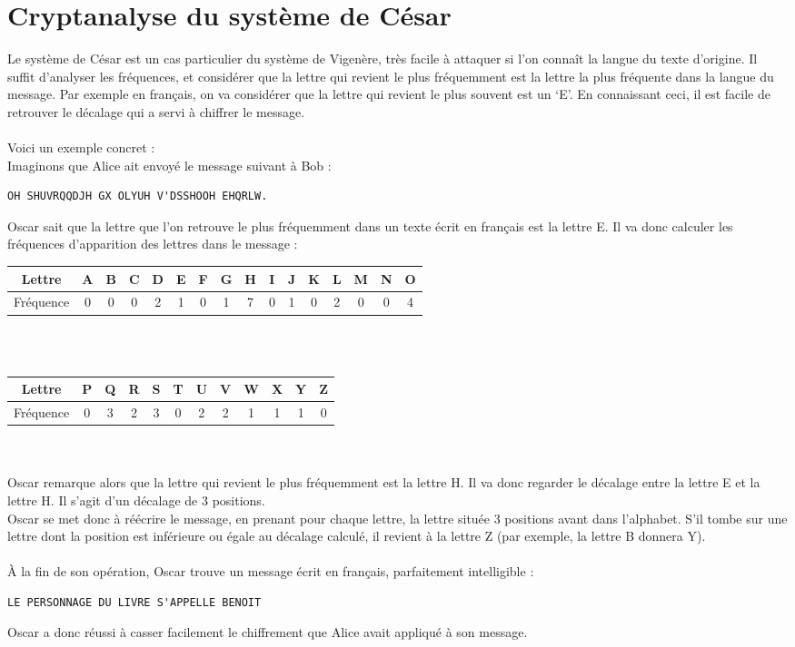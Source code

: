	\section{Cryptanalyse du système de César}
		Le système de César est un cas particulier du système de Vigenère, très facile à attaquer si l’on connaît la langue du texte d’origine. Il suffit d’analyser les fréquences, et considérer que la lettre qui revient le plus fréquemment est la lettre la plus fréquente dans la langue du message. Par exemple en français, on va considérer que la lettre qui revient le plus souvent est un ‘E’. En connaissant ceci, il est facile de retrouver le décalage qui a servi à chiffrer le message.\\
		\\
		Voici un exemple concret :\\
		Imaginons que Alice ait envoyé le message suivant à Bob :
		\begin{lstlisting}
OH SHUVRQQDJH GX OLYUH V'DSSHOOH EHQRLW.
		\end{lstlisting}
		Oscar sait que la lettre que l'on retrouve le plus fréquemment dans un texte écrit en français est la lettre E.
		Il va donc calculer les fréquences d'apparition des lettres dans le message :\\
		\begin{tabular}{ | c | c | c | c | c | c | c | c | c | c | c | c | c | c | c | c | }
			\hline
			Lettre & A & B & C & D & E & F & G & H & I & J & K & L & M & N & O\\ \hline
			Fréquence & 0 & 0 & 0 & 2 & 1 & 0 & 1 & 7 & 0 & 1  & 0 & 2 & 0 & 0 & 4\\
			\hline
		\end{tabular}\\
		\\
		\begin{tabular}{ | c | c | c | c | c | c | c | c | c | c | c | c | }
			\hline
			Lettre & P & Q & R & S & T & U & V & W & X & Y & Z\\ \hline
			Fréquence & 0 & 3 & 2 & 3 & 0 & 2 & 2 & 1 & 1 & 1 & 0\\
			\hline
		\end{tabular}\\
		\\
		Oscar remarque alors que la lettre qui revient le plus fréquemment est la lettre H. Il va donc regarder le décalage entre la lettre E et la lettre H. Il s'agit d'un décalage de 3 positions.\\
		Oscar se met donc à réécrire le message, en prenant pour chaque lettre, la lettre située 3 positions avant dans l'alphabet. S'il tombe sur une lettre dont la position est inférieure ou égale au décalage calculé, il revient à la lettre Z (par exemple, la lettre B donnera Y).\\
		\\
		À la fin de son opération, Oscar trouve un message écrit en français, parfaitement intelligible :
		\begin{lstlisting}
LE PERSONNAGE DU LIVRE S'APPELLE BENOIT
		\end{lstlisting}
		Oscar a donc réussi à casser facilement le chiffrement que Alice avait appliqué à son message.
